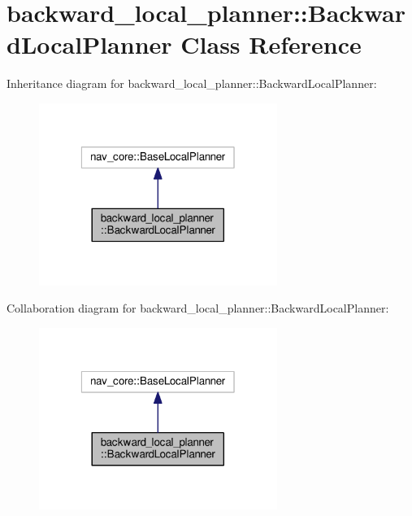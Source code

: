 \hypertarget{classbackward__local__planner_1_1BackwardLocalPlanner}{\section{backward\-\_\-local\-\_\-planner\-:\-:Backward\-Local\-Planner Class Reference}
\label{classbackward__local__planner_1_1BackwardLocalPlanner}
}


Inheritance diagram for backward\-\_\-local\-\_\-planner\-:\-:Backward\-Local\-Planner\-:
\nopagebreak
\begin{figure}[H]
\begin{center}
\leavevmode
\includegraphics[width=220pt]{classbackward__local__planner_1_1BackwardLocalPlanner__inherit__graph}
\end{center}
\end{figure}


Collaboration diagram for backward\-\_\-local\-\_\-planner\-:\-:Backward\-Local\-Planner\-:
\nopagebreak
\begin{figure}[H]
\begin{center}
\leavevmode
\includegraphics[width=220pt]{classbackward__local__planner_1_1BackwardLocalPlanner__coll__graph}
\end{center}
\end{figure}
